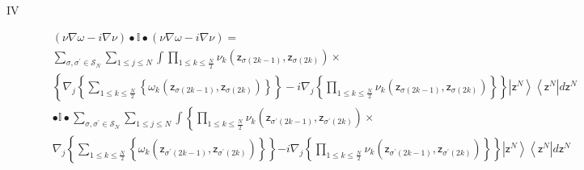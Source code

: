 \documentclass[aps,preprint]{revtex4}%
\begin{document}
\begin{description}
\item[IV]
\begin{align}
&  \left(  \nu\nabla\omega-i\nabla\nu\right)  \bullet\mathbb{I}\bullet\left(
\nu\nabla\omega-i\nabla\nu\right)  \left.  =\right. \nonumber\\
&
{\displaystyle\sum\limits_{\sigma,\sigma^{\prime}\in\mathcal{S}_{N}}}
{\displaystyle\sum\limits_{1\leq j\leq N}}
\int%
{\displaystyle\prod\limits_{1\leq k\leq\frac{N}{2}}}
\nu_{k}\left(  \mathsf{z}_{\sigma\left(  2k-1\right)  },\mathsf{z}%
_{\sigma\left(  2k\right)  }\right)  \times\nonumber\\
&  \left\{  \nabla_{j}\left\{
{\displaystyle\sum\limits_{1\leq k\leq\frac{N}{2}}}
\left\{  \omega_{k}\left(  \mathsf{z}_{\sigma\left(  2k-1\right)  }%
,\mathsf{z}_{\sigma\left(  2k\right)  }\right)  \right\}  \right\}
-i\nabla_{j}\left\{
{\displaystyle\prod\limits_{1\leq k\leq\frac{N}{2}}}
\nu_{k}\left(  \mathsf{z}_{\sigma\left(  2k-1\right)  },\mathsf{z}%
_{\sigma\left(  2k\right)  }\right)  \right\}  \right\}  \left\vert
\mathsf{z}^{N}\right\rangle \left\langle \mathsf{z}^{N}\right\vert
d\mathsf{z}^{N}\nonumber\\
&  \bullet\mathbb{I}\bullet%
{\displaystyle\sum\limits_{\sigma,\sigma^{\prime}\in\mathcal{S}_{N}}}
{\displaystyle\sum\limits_{1\leq j\leq N}}
\int\left\{
{\displaystyle\prod\limits_{1\leq k\leq\frac{N}{2}}}
\nu_{k}\left(  \mathsf{z}_{\sigma^{\prime}\left(  2k-1\right)  }%
,\mathsf{z}_{\sigma^{\prime}\left(  2k\right)  }\right)  \right.  \times\\
&  \nabla_{j}\left\{
{\displaystyle\sum\limits_{1\leq k\leq\frac{N}{2}}}
\left\{  \omega_{k}\left(  \mathsf{z}_{\sigma^{\prime}\left(  2k-1\right)
},\mathsf{z}_{\sigma^{\prime}\left(  2k\right)  }\right)  \right\}  \right\}
\left.  -i\nabla_{j}\left\{
{\displaystyle\prod\limits_{1\leq k\leq\frac{N}{2}}}
\nu_{k}\left(  \mathsf{z}_{\sigma^{\prime}\left(  2k-1\right)  }%
,\mathsf{z}_{\sigma^{\prime}\left(  2k\right)  }\right)  \right\}  \right\}
\left\vert \mathsf{z}^{N}\right\rangle \left\langle \mathsf{z}^{N}\right\vert
d\mathsf{z}^{N}%
\end{align}

\end{description}
\end{document}
